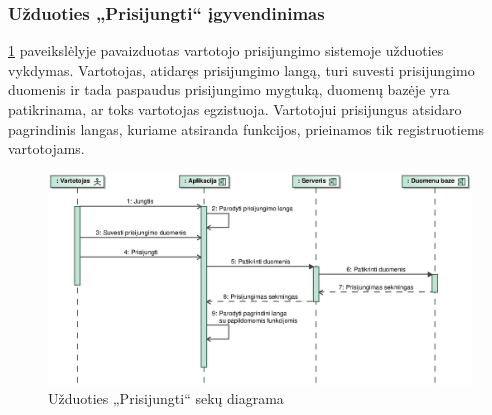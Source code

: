 \documentclass[12pt]{article}
\begin{document}
	\subsubsection{Užduoties „Prisijungti“ įgyvendinimas}
	\ref{LogInSeq} paveikslėlyje pavaizduotas vartotojo prisijungimo sistemoje užduoties vykdymas. Vartotojas, atidaręs prisijungimo langą, turi suvesti prisijungimo duomenis ir tada paspaudus prisijungimo mygtuką, duomenų bazėje yra patikrinama, ar toks vartotojas egzistuoja. Vartotojui prisijungus atsidaro pagrindinis langas, kuriame atsiranda funkcijos, prieinamos tik registruotiems vartotojams.
	\begin{figure}[h]
		\begin{center}
			\includegraphics[width=\textwidth]{Prisijungti.eps}
			\caption{Užduoties „Prisijungti“ sekų diagrama\label{LogInSeq}}
		\end{center}
	\end{figure}
	

	\pagebreak
	
\end{document}

